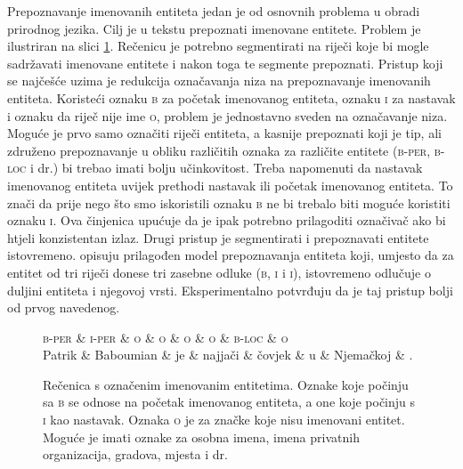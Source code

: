 Prepoznavanje imenovanih entiteta  jedan je od
osnovnih problema u obradi prirodnog jezika. Cilj je u tekstu prepoznati
imenovane entitete. Problem je ilustriran na slici
\ref{fig:namedentityrecognition}. Rečenicu je potrebno segmentirati na riječi
koje bi mogle sadržavati imenovane entitete i nakon toga te segmente prepoznati.
Pristup koji se najčešće uzima je redukcija označavanja niza na prepoznavanje
imenovanih entiteta. Koristeći oznaku \textsc{b} za početak imenovanog entiteta,
oznaku \textsc{i} za nastavak i oznaku da riječ nije ime \textsc{o}, problem je
jednostavno sveden na označavanje niza. Moguće je prvo samo označiti riječi
entiteta, a kasnije prepoznati koji je tip, ali združeno prepoznavanje u obliku
različitih oznaka za različite entitete (\textsc{b-per}, \textsc{b-loc} i dr.)
bi trebao imati bolju učinkovitost. Treba napomenuti da nastavak imenovanog
entiteta uvijek prethodi nastavak ili početak imenovanog entiteta. To znači da
prije nego što smo iskoristili oznaku \textsc{b} ne bi trebalo biti moguće
koristiti oznaku \textsc{i}. Ova činjenica upućuje da je ipak potrebno
prilagoditi označivač ako bi htjeli konzistentan izlaz. Drugi pristup je
segmentirati i prepoznavati entitete istovremeno. \citet{sarawagi2004semi}
opisuju prilagođen model prepoznavanja entiteta koji, umjesto da za entitet od
tri riječi donese tri zasebne odluke (\textsc{b}, \textsc{i} i \textsc{i}),
istovremeno odlučuje o duljini entiteta i njegovoj vrsti. Eksperimentalno
potvrđuju da je taj pristup bolji od prvog navedenog.

\begin{figure}[H]
\centering
\begin{dependency}
\begin{deptext}
  \textsc{b-per} \& \textsc{i-per} \& \textsc{o} \& \textsc{o} \& \textsc{o} \& \textsc{o} \& \textsc{b-loc} \& \textsc{o} \\
  Patrik         \& Baboumian      \& je         \& najjači    \& čovjek     \& u          \& Njemačkoj      \& .          \\
\end{deptext}
\end{dependency}
\caption[Rečenica s označenim imenovanim entitetima.]{Rečenica s označenim
imenovanim entitetima. Oznake koje počinju sa \textsc{b} se odnose na početak
imenovanog entiteta, a one koje počinju s \textsc{i} kao nastavak. Oznaka
\textsc{o} je za značke koje nisu imenovani entitet. Moguće je imati oznake za
osobna imena, imena privatnih organizacija, gradova, mjesta i dr.}
\label{fig:namedentityrecognition}
\end{figure}

